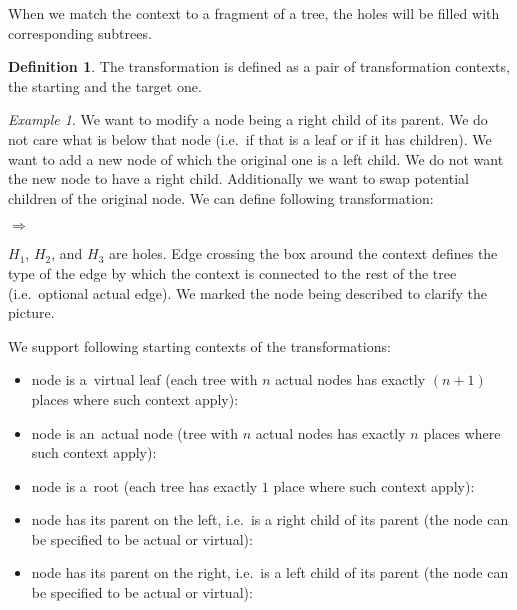 \documentclass[final]{article}
\theoremstyle{definition}
\newtheorem{definition}{Definition}[subsection]
\theoremstyle{definition}
\theoremstyle{remark}
\newtheorem{example}{Example}[subsection]
\newcommand{\includeinlinescaledsvg}[3]{\begin{minipage}{#1\textwidth}\begin{center}\end{center}\end{minipage}}
\begin{document}
When we match the context to a fragment of a tree, the holes will be filled with corresponding subtrees.

\begin{definition}
    The transformation is defined as a pair of transformation contexts, the starting and the target one.
\end{definition}

\begin{example}%
    \label{ex:transformation}%
    We want to modify a node being a right child of its parent. We do not care what is below that node (i.e.~if that is a leaf or if it has children). We want to add a new node of which the original one is a left child. We do not want the new node to have a right child. Additionally we want to swap potential children of the original node. We can define following transformation:
    \begin{center}
        \includeinlinescaledsvg{.4}{.7}{lambda__contexts__def_001}%
        \(\Rightarrow\)
        \includeinlinescaledsvg{.4}{.7}{lambda__contexts__def_002}%
    \end{center}
\end{example}

\(H_1\), \(H_2\), and \(H_3\) are holes. Edge crossing the box around the context defines the type of the edge by which the context is connected to the rest of the tree (i.e.~optional actual edge). We marked the node being described to clarify the picture.

We support following starting contexts of the transformations:

\begin{itemize}
    \item node is a~virtual leaf (each tree with \(n\) actual nodes has exactly \((n + 1)\) places where such context apply):\\
        \includeinlinescaledsvg{1}{.7}{lambda__contexts__type_001}%
    \item node is an~actual node (tree with \(n\) actual nodes has exactly \(n\) places where such context apply):\\
        \includeinlinescaledsvg{1}{.7}{lambda__contexts__type_002}%
    \item node is a~root (each tree has exactly \(1\) place where such context apply):\\
        \includeinlinescaledsvg{1}{.7}{lambda__contexts__type_003}%
    \item node has its parent on the left, i.e.~is a right child of its parent (the node can be specified to be actual or virtual):\\
        \includeinlinescaledsvg{.5}{.7}{lambda__contexts__type_004}%
        \includeinlinescaledsvg{.5}{.7}{lambda__contexts__type_004b}%
    \item node has its parent on the right, i.e.~is a left child of its parent (the node can be specified to be actual or virtual):\\
        \includeinlinescaledsvg{.5}{.7}{lambda__contexts__type_005}%
        \includeinlinescaledsvg{.5}{.7}{lambda__contexts__type_005b}%
\end{itemize}
\end{document}
